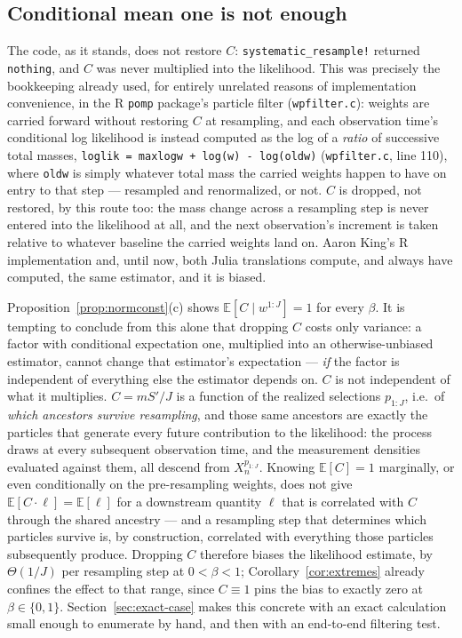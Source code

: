 \documentclass[11pt]{article}
\newcommand{\E}{\mathbb{E}}
\begin{document}
\subsection{Conditional mean one is not enough}
\label{sec:telescoping-route}

The code, as it stands, does not restore $C$: \texttt{systematic\_resample!}
returned \texttt{nothing}, and $C$ was never multiplied into the likelihood.
This was precisely the bookkeeping already used, for entirely unrelated
reasons of implementation convenience, in the R \texttt{pomp} package's
particle filter (\texttt{wpfilter.c}): weights are carried forward without
restoring $C$ at resampling, and each observation time's conditional log
likelihood is instead computed as the log of a \emph{ratio} of successive
total masses, \texttt{loglik = maxlogw + log(w) - log(oldw)}
(\texttt{wpfilter.c}, line 110), where \texttt{oldw} is simply whatever
total mass the carried weights happen to have on entry to that step —
resampled and renormalized, or not. $C$ is dropped, not restored, by this
route too: the mass change across a resampling step is never entered into
the likelihood at all, and the next observation's increment is taken
relative to whatever baseline the carried weights land on. Aaron King's R
implementation and, until now, both Julia translations compute, and always
have computed, the same estimator, and it is biased.

Proposition~\ref{prop:normconst}(c) shows $\E[C\mid w^{1:J}]=1$ for every
$\beta$. It is tempting to conclude from this alone that dropping $C$ costs
only variance: a factor with conditional expectation one, multiplied into
an otherwise-unbiased estimator, cannot change that estimator's expectation
— \emph{if} the factor is independent of everything else the estimator
depends on. $C$ is not independent of what it multiplies. $C = m S'/J$ is a
function of the realized selections $p_{1:J}$, i.e.\ of \emph{which
ancestors survive resampling}, and those same ancestors are exactly the
particles that generate every future contribution to the likelihood: the
process draws at every subsequent observation time, and the measurement
densities evaluated against them, all descend from $X_n^{p_{1:J}}$. Knowing
$\E[C]=1$ marginally, or even conditionally on the pre-resampling weights,
does not give $\E[C\cdot\ell]=\E[\ell]$ for a downstream quantity $\ell$
that is correlated with $C$ through the shared ancestry — and a resampling
step that determines which particles survive is, by construction,
correlated with everything those particles subsequently produce. Dropping
$C$ therefore biases the likelihood estimate, by $\Theta(1/J)$ per
resampling step at $0<\beta<1$; Corollary~\ref{cor:extremes} already
confines the effect to that range, since $C\equiv1$ pins the bias to
exactly zero at $\beta\in\{0,1\}$. Section~\ref{sec:exact-case} makes
this concrete with an exact calculation small enough to enumerate by hand,
and then with an end-to-end filtering test.
\end{document}
